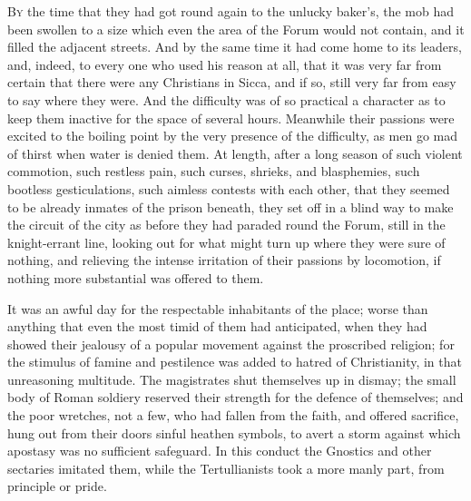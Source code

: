 B\textsc{y} the time that they had got round again to the unlucky
baker's, the mob had been swollen to a size which even the area of the
Forum would not contain, and it filled the adjacent streets. And by
the same time it had come home to its leaders, and, indeed, to every
one who used his reason at all, that it was very far from certain that
there were any Christians in Sicca, and if so, still very far from
easy to say where they were. And the difficulty was of so practical a
character as to keep them inactive for the space of several hours.
Meanwhile their passions were excited to the boiling point by the very
presence of the difficulty, as men go mad of thirst when water is
denied them. At length, after a long season of such violent commotion,
such restless pain, such curses, shrieks, and blasphemies, such
bootless gesticulations, such aimless contests with each other, that
they seemed to be already inmates of the prison beneath, they set off
in a blind way to make the circuit of the city as before they had
paraded round the Forum, still in the knight-errant line, looking out
for what might turn up where they were sure of nothing, and relieving
the intense irritation of their passions by locomotion, if
nothing more substantial was offered to them.

It was an awful day for the respectable inhabitants of the place;
worse than anything that even the most timid of them had anticipated,
when they had showed their jealousy of a popular movement against the
proscribed religion; for the stimulus of famine and pestilence was
added to hatred of Christianity, in that unreasoning multitude. The
magistrates shut themselves up in dismay; the small body of Roman
soldiery reserved their strength for the defence of themselves; and
the poor wretches, not a few, who had fallen from the faith, and
offered sacrifice, hung out from their doors sinful heathen symbols,
to avert a storm against which apostasy was no sufficient safeguard.
In this conduct the Gnostics and other sectaries imitated them, while
the Tertullianists took a more manly part, from principle or pride.

